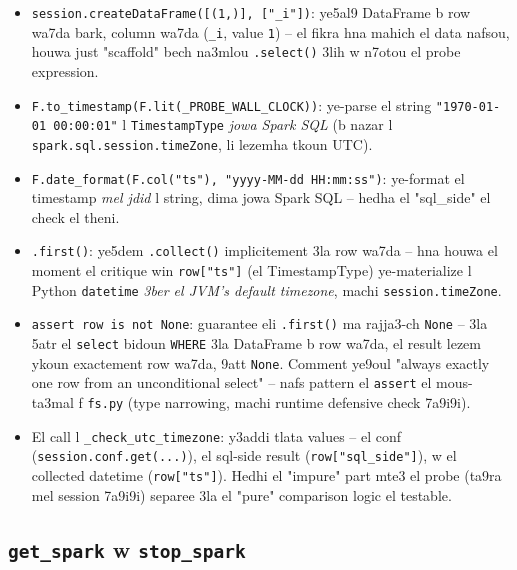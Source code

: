 \documentclass[11pt,a4paper]{report}
\DeclareRobustCommand{\code}[1]{\texttt{#1}}
\begin{document}
\begin{itemize}
  \item \code{session.createDataFrame([(1,)], ["\_i"])}: ye5al9 DataFrame
        b row wa7da bark, column wa7da (\code{\_i}, value \code{1}) --
        el fikra hna mahich el data nafsou, houwa just "scaffold" bech
        na3mlou \code{.select()} 3lih w n7otou el probe expression.
  \item \code{F.to\_timestamp(F.lit(\_PROBE\_WALL\_CLOCK))}: ye-parse el
        string \code{"1970-01-01 00:00:01"} l \code{TimestampType} \emph{jowa
        Spark SQL} (b nazar l \code{spark.sql.session.timeZone}, li lezemha
        tkoun UTC).
  \item \code{F.date\_format(F.col("ts"), "yyyy-MM-dd HH:mm:ss")}: ye-format
        el timestamp \emph{mel jdid} l string, dima jowa Spark SQL -- hedha
        el "sql\_side" el check el theni.
  \item \code{.first()}: ye5dem \code{.collect()} implicitement 3la row
        wa7da -- hna houwa el moment el critique win \code{row["ts"]}
        (el TimestampType) ye-materialize l Python \code{datetime} \emph{3ber
        el JVM's default timezone}, machi \code{session.timeZone}.
  \item \code{assert row is not None}: guarantee eli \code{.first()} ma
        rajja3-ch \code{None} -- 3la 5atr el \code{select} bidoun \code{WHERE}
        3la DataFrame b row wa7da, el result lezem ykoun exactement row
        wa7da, 9att \code{None}. Comment ye9oul "always exactly one row
        from an unconditional select" -- nafs pattern el \code{assert}
        el mous-ta3mal f \code{fs.py} (type narrowing, machi runtime
        defensive check 7a9i9i).
  \item El call l \code{\_check\_utc\_timezone}: y3addi tlata values --
        el conf (\code{session.conf.get(...)}), el sql-side result
        (\code{row["sql\_side"]}), w el collected datetime (\code{row["ts"]}).
        Hedhi el "impure" part mte3 el probe (ta9ra mel session 7a9i9i)
        separee 3la el "pure" comparison logic el testable.
\end{itemize}

\subsection{\code{get\_spark} w \code{stop\_spark}}
\end{document}
